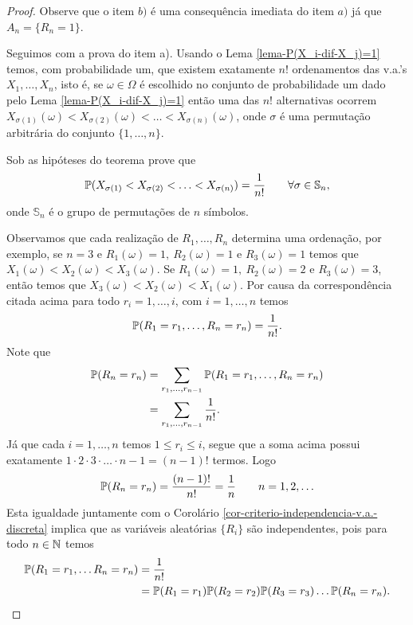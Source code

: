 \begin{proof}
	Observe que o item $b)$ é uma consequência imediata do 
	item $a)$ já que $A_n=\{R_n=1\}$. 
	
	Seguimos com a prova do item a). 
	Usando o Lema \ref{lema-P(X_i-dif-X_j)=1}	
	temos, com probabilidade um, que 
	existem exatamente $n!$ ordenamentos das v.a.'s 
	$X_1,\ldots,X_n$, isto é, se 	$\omega\in\Omega$ é
	escolhido no conjunto de probabilidade um dado pelo 
	Lema \ref{lema-P(X_i-dif-X_j)=1} então  
    uma das $n!$ alternativas ocorrem 
    $X_{\sigma(1)}(\omega)<X_{\sigma(2)}(\omega)<\ldots <X_{\sigma(n)}(\omega)$,
    onde $\sigma$ é uma permutação arbitrária do conjunto $\{1,\ldots,n\}$.
	

\begin{exercicio}
	Sob as hipóteses do teorema prove que
		\[
			\P(X_{\sigma(1)}<X_{\sigma(2)}<\ldots <X_{\sigma(n)})=\frac{1}{n!}
			\qquad \forall \sigma\in \mathbb{S}_n,
		\]
onde $\mathbb{S}_n$ é o grupo de permutações de $n$ símbolos.
\end{exercicio}


Observamos que cada realização de 
$R_1,\ldots, R_n$ determina uma ordenação,
por exemplo, se $n=3$ e $R_1(\omega)=1,\ R_2(\omega)=1$
e $R_3(\omega)=1$ temos que 
$X_1(\omega)<X_2(\omega)<X_3(\omega)$.
Se $R_1(\omega)=1,\ R_2(\omega)=2$ e $R_3(\omega)=3$,
então temos que $X_3(\omega)<X_2(\omega)<X_1(\omega)$.
Por causa da correspondência citada acima para todo
$r_i=1,\ldots,i$, com $i=1,\ldots,n$ temos 
	\[
		\P(R_1=r_1,\ldots, R_n=r_n)=\frac{1}{n!}.
	\]
Note que 
	\begin{align*}
	\P(R_n=r_n)
	&=
	\sum_{r_1,\ldots,r_{n-1}} \P(R_1=r_1,\ldots,R_n=r_n) 
	\\
	&=
	\sum_{r_1,\ldots, r_{n-1}} \frac{1}{n!}.
	\end{align*}
Já que cada $i=1,\ldots,n$ temos $1\leq r_i\leq i$,
segue que a soma acima possui exatamente 
$1\cdot 2\cdot 3\cdot\ldots\cdot n-1=(n-1)!$
termos. Logo  
	\[
		\P(R_n=r_n)=\frac{(n-1)!}{n!}=\frac{1}{n}
		\qquad
		n=1,2,\ldots
	\]
Esta igualdade juntamente com o Corolário 
\ref{cor-criterio-independencia-v.a.-discreta}
implica que as variáveis aleatórias $\{R_i\}$
são independentes, pois para todo $n\in\N$ temos
	\begin{align*}
		\P(R_1=r_1,\ldots R_n=r_n)
		&=\frac{1}{n!}
		\\
		&=\P(R_1=r_1)\P(R_2=r_2)\P(R_3=r_3)\ldots\P(R_n=r_n).
	\end{align*}
\end{proof}



